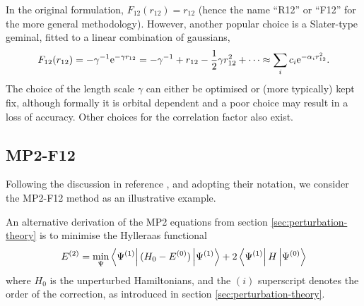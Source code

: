 In the original formulation, $F_{12}(r_{12})=r_{12}$ (hence the name ``R12'' or ``F12'' for the more general methodology). However, another popular choice is a Slater-type geminal, fitted to a linear combination of gaussians,
\begin{equation}
    F_{12}(r_{12})=-\gamma^{-1}\mathrm{e}^{-\gamma r_{12}} = -\gamma^{-1}+r_{12}-\frac 12\gamma r_{12}^2+\cdots \approx \sum_i c_i\mathrm{e}^{-\alpha_ir_{12}^2}.
\end{equation}
The choice of the length scale $\gamma$ can either be optimised or (more typically) kept fix, although formally it is orbital dependent and a poor choice may result in a loss of accuracy.\supercite{tewRelaxing2018} Other choices for the correlation factor also exist.

\subsection{MP2-F12}

Following the discussion in reference , and adopting their notation, we consider the MP2-F12 method as an illustrative example.

An alternative derivation of the \gls{MP2} equations from section \ref{sec:perturbation-theory} is to minimise the Hylleraas functional
\begin{equation}
    \label{eq:hyllerass-functional}
    E^{(2)} = \min_\Psi\bra{\Psi^{(1)}}(H_0-E^{(0)})\ket{\Psi^{(1)}}+2\bra{\Psi^{(1)}}H\ket{\Psi^{(0)}}
\end{equation}
where $H_0$ is the unperturbed Hamiltonians, and the $(i)$ superscript denotes the order of the correction, as introduced in section \ref{sec:perturbation-theory}.

